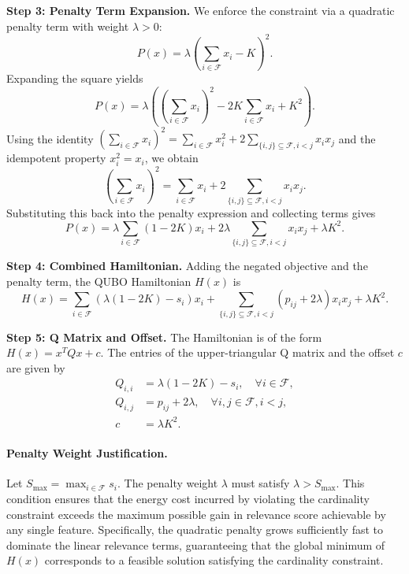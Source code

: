 \documentclass[12pt]{article}
\begin{document}
\textbf{Step 3: Penalty Term Expansion.}
We enforce the constraint via a quadratic penalty term with weight $\lambda > 0$:
\begin{equation}
    P(x) = \lambda \left( \sum_{i \in \mathcal{F}} x_i - K \right)^2.
\end{equation}
Expanding the square yields
\begin{equation}
    P(x) = \lambda \left( \left(\sum_{i \in \mathcal{F}} x_i\right)^2 - 2K \sum_{i \in \mathcal{F}} x_i + K^2 \right).
\end{equation}
Using the identity $\left(\sum_{i \in \mathcal{F}} x_i\right)^2 = \sum_{i \in \mathcal{F}} x_i^2 + 2 \sum_{\{i,j\} \subseteq \mathcal{F}, i < j} x_i x_j$ and the idempotent property $x_i^2 = x_i$, we obtain
\begin{equation}
    \left(\sum_{i \in \mathcal{F}} x_i\right)^2 = \sum_{i \in \mathcal{F}} x_i + 2 \sum_{\{i,j\} \subseteq \mathcal{F}, i < j} x_i x_j.
\end{equation}
Substituting this back into the penalty expression and collecting terms gives
\begin{equation}
    P(x) = \lambda \sum_{i \in \mathcal{F}} (1 - 2K) x_i + 2\lambda \sum_{\{i,j\} \subseteq \mathcal{F}, i < j} x_i x_j + \lambda K^2.
\end{equation}

\textbf{Step 4: Combined Hamiltonian.}
Adding the negated objective and the penalty term, the QUBO Hamiltonian $H(x)$ is
\begin{equation}
    H(x) = \sum_{i \in \mathcal{F}} \left( \lambda(1 - 2K) - s_i \right) x_i + \sum_{\{i,j\} \subseteq \mathcal{F}, i < j} \left( p_{ij} + 2\lambda \right) x_i x_j + \lambda K^2.
\end{equation}

\textbf{Step 5: Q Matrix and Offset.}
The Hamiltonian is of the form $H(x) = x^T Q x + c$. The entries of the upper-triangular Q matrix and the offset $c$ are given by
\begin{align}
    Q_{i,i} &= \lambda(1 - 2K) - s_i, \quad \forall i \in \mathcal{F}, \\
    Q_{i,j} &= p_{ij} + 2\lambda, \quad \forall i, j \in \mathcal{F}, i < j, \\
    c &= \lambda K^2.
\end{align}

\paragraph{Penalty Weight Justification.}
Let $S_{\max} = \max_{i \in \mathcal{F}} s_i$. The penalty weight $\lambda$ must satisfy $\lambda > S_{\max}$. This condition ensures that the energy cost incurred by violating the cardinality constraint exceeds the maximum possible gain in relevance score achievable by any single feature. Specifically, the quadratic penalty grows sufficiently fast to dominate the linear relevance terms, guaranteeing that the global minimum of $H(x)$ corresponds to a feasible solution satisfying the cardinality constraint.
\end{document}
